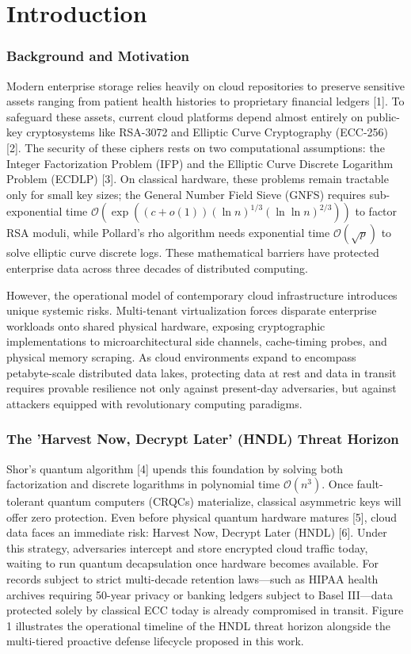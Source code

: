 \documentclass[5p,times]{elsarticle}
\begin{document}
\section{Introduction}


\subsubsection{Background and Motivation}

Modern enterprise storage relies heavily on cloud repositories to preserve sensitive assets ranging from patient health histories to proprietary financial ledgers [1]. To safeguard these assets, current cloud platforms depend almost entirely on public-key cryptosystems like RSA-3072 and Elliptic Curve Cryptography (ECC-256) [2]. The security of these ciphers rests on two computational assumptions: the Integer Factorization Problem (IFP) and the Elliptic Curve Discrete Logarithm Problem (ECDLP) [3]. On classical hardware, these problems remain tractable only for small key sizes; the General Number Field Sieve (GNFS) requires sub-exponential time $\mathcal{O}(\exp((c+o(1))(\ln n)^{1/3}(\ln \ln n)^{2/3}))$ to factor RSA moduli, while Pollard's rho algorithm needs exponential time $\mathcal{O}(\sqrt{p})$ to solve elliptic curve discrete logs. These mathematical barriers have protected enterprise data across three decades of distributed computing.

However, the operational model of contemporary cloud infrastructure introduces unique systemic risks. Multi-tenant virtualization forces disparate enterprise workloads onto shared physical hardware, exposing cryptographic implementations to microarchitectural side channels, cache-timing probes, and physical memory scraping. As cloud environments expand to encompass petabyte-scale distributed data lakes, protecting data at rest and data in transit requires provable resilience not only against present-day adversaries, but against attackers equipped with revolutionary computing paradigms.


\subsubsection{The 'Harvest Now, Decrypt Later' (HNDL) Threat Horizon}

Shor's quantum algorithm [4] upends this foundation by solving both factorization and discrete logarithms in polynomial time $\mathcal{O}(n^3)$. Once fault-tolerant quantum computers (CRQCs) materialize, classical asymmetric keys will offer zero protection. Even before physical quantum hardware matures [5], cloud data faces an immediate risk: Harvest Now, Decrypt Later (HNDL) [6]. Under this strategy, adversaries intercept and store encrypted cloud traffic today, waiting to run quantum decapsulation once hardware becomes available. For records subject to strict multi-decade retention laws---such as HIPAA health archives requiring 50-year privacy or banking ledgers subject to Basel III---data protected solely by classical ECC today is already compromised in transit. Figure 1 illustrates the operational timeline of the HNDL threat horizon alongside the multi-tiered proactive defense lifecycle proposed in this work.
\end{document}
